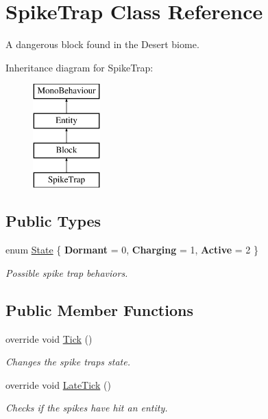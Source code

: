 \hypertarget{class_spike_trap}{}\section{Spike\+Trap Class Reference}
\label{class_spike_trap}


A dangerous block found in the Desert biome.  


Inheritance diagram for Spike\+Trap\+:\begin{figure}[H]
\begin{center}
\leavevmode
\includegraphics[height=4.000000cm]{class_spike_trap}
\end{center}
\end{figure}
\subsection*{Public Types}
\begin{DoxyCompactItemize}
\item 
enum \mbox{\hyperlink{class_spike_trap_aef68a8a783dac108341ca190a4dc0f81}{State}} \{ {\bfseries Dormant} = 0, 
{\bfseries Charging} = 1, 
{\bfseries Active} = 2
 \}
\begin{DoxyCompactList}\small\item\em Possible spike trap behaviors. \end{DoxyCompactList}\end{DoxyCompactItemize}
\subsection*{Public Member Functions}
\begin{DoxyCompactItemize}
\item 
override void \mbox{\hyperlink{class_spike_trap_ae5f99ac571f8c550780bae8eacef23c0}{Tick}} ()
\begin{DoxyCompactList}\small\item\em Changes the spike trap\textquotesingle{}s state. \end{DoxyCompactList}\item 
override void \mbox{\hyperlink{class_spike_trap_acedae588051f3999c6c364ae031c9814}{Late\+Tick}} ()
\begin{DoxyCompactList}\small\item\em Checks if the spikes have hit an entity. \end{DoxyCompactList}\end{DoxyCompactItemize}
